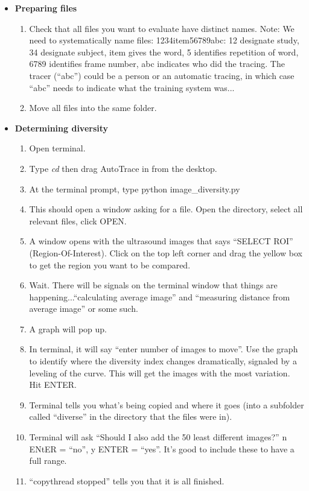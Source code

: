 \documentclass[12pt]{article}
\begin{document}

\begin{itemize}
\item {\bf Preparing files}
\begin{enumerate}
	\item Check that all files you want to evaluate have distinct names. Note: We need to systematically name files: 1234item56789abc: 12 designate study, 34 designate subject, item gives the word, 5 identifies repetition of word, 6789 identifies frame number, abc indicates who did the tracing. The tracer (``abc'') could be a person or an automatic tracing, in which case ``abc'' needs to indicate what the training system was...
	\item Move all files into the same folder.
\end{enumerate}

\item {\bf Determining diversity}
\begin{enumerate}
	\item Open terminal.
	\item Type {\it cd} then drag AutoTrace in from the desktop.
	\item At the terminal prompt, type python image\_diversity.py
	\item This should open a window asking for a file. Open the directory, select all relevant files,  click OPEN.
	\item A window opens with the ultrasound images that says ``SELECT ROI'' (Region-Of-Interest). Click on the top left corner and drag the yellow box to get the region you want to be compared.
	\item Wait. There will be signals on the terminal window that things are happening...``calculating average image'' and ``measuring distance from average image'' or some such.
	\item A graph will pop up.
	\item In terminal, it will say ``enter number of images to move''. Use the graph to identify where the diversity index changes dramatically, signaled by a leveling of the curve. This will get the images with the most variation. Hit ENTER.
	\item Terminal tells you what's being copied and where it goes (into a subfolder called ``diverse'' in the directory that the files were in).
	\item Terminal will ask ``Should I also add the 50 least different images?'' n ENtER = ``no'', y ENTER = ``yes''. It's good to include these to have a full range.
	\item ``copythread stopped'' tells you that it is all finished.
\end{enumerate}


\end{itemize}
\end{document}
